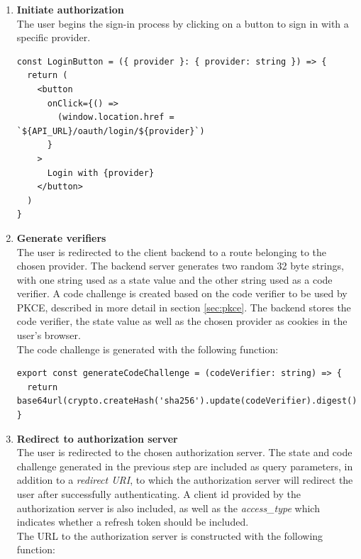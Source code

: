\clearpage
\begin{enumerate}
    \item \textbf{Initiate authorization} \\
    The user begins the sign-in process by clicking on a button to sign in with a specific provider.
\begin{lstlisting}[style=ES6, caption={Login button}]
const LoginButton = ({ provider }: { provider: string }) => {
  return (
    <button
      onClick={() =>
        (window.location.href = `${API_URL}/oauth/login/${provider}`)
      }
    >
      Login with {provider}
    </button>
  )
}
\end{lstlisting}

    \item \textbf{Generate verifiers} \\
    The user is redirected to the client backend to a route belonging to the chosen provider.
    The backend server generates two random 32 byte strings, with one string used as a state value and the other string used as a code verifier.
    A code challenge is created based on the code verifier to be used by PKCE, described in more detail in section \ref{sec:pkce}.
    The backend stores the code verifier, the state value as well as the chosen provider as cookies in the user's browser. \\
    The code challenge is generated with the following function:
    \begin{lstlisting}[style=ES6, caption={Code challenge generation}]
export const generateCodeChallenge = (codeVerifier: string) => {
  return base64url(crypto.createHash('sha256').update(codeVerifier).digest())
}
\end{lstlisting}
    \item \textbf{Redirect to authorization server} \\
    The user is redirected to the chosen authorization server.
    The state and code challenge generated in the previous step are included as query parameters, in addition to a \textit{redirect URI}, to which the authorization server will redirect the user after successfully authenticating.
    A client id provided by the authorization server is also included, as well as the \textit{access\_type} which indicates whether a refresh token should be included. \\
    The URL to the authorization server is constructed with the following function:
    

\end{enumerate}
